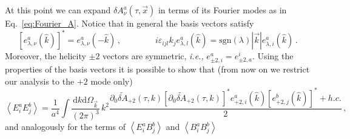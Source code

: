 At this point we can expand $ \delta A^a_\nu(\tau, \vec x)$ in terms of its Fourier modes as in Eq.~\eqref{eq:Fourier_A}. Notice that in general the basis vectors satisfy 
\begin{equation}
   \left[ e_{\lambda, \nu}^a (\hat{k}) \right]^* = e_{\lambda, \nu}^a (-\hat{k}) \, , \qquad \qquad i \varepsilon_{ijl} k_j e_{\lambda, l}^a (\hat{k}) = \text{sgn}(\lambda) |\vec{k}| e_{\lambda, i}^a (\hat{k}) \, .
\end{equation}
Moreover, the helicity $\pm2$ vectors are symmetric, \emph{i.e.,} $e_{\pm2, i}^a = e_{\pm2, a}^i$. Using the properties of the basis vectors it is possible to show that (from now on we restrict our analysis to the $+2$ mode only)
\begin{equation}
  \left \langle E^a_{i}  E^b_{j} \right \rangle  = \frac{1}{a^4} \int \frac{\textrm{d} k \textrm{d} \Omega_{\vec{k}} }{(2 \pi)^{3}} \, k^2   \frac{ \partial_0 \tilde{\delta A}_{+2}(\tau,  k) \left[ \partial_0 \tilde{\delta A}_{+2}(\tau,  k) \right]^*  e_{+2, i}^a (\hat{k}) \left[ e_{+2, j}^b (\hat{k}) \right]^*  +h. c.}{2}  \, ,
\end{equation}
and analogously for the terms of $ \left \langle E^a_{i} B^b_{j} \right \rangle$ and $ \left \langle B^a_{i} B^b_{j} \right \rangle$
